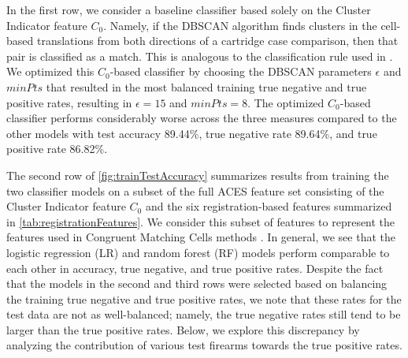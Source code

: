 \documentclass[reprint]{JASA}
\begin{document}
In the first row, we consider a baseline classifier based solely on the
Cluster Indicator feature \(C_0\). Namely, if the DBSCAN algorithm finds
clusters in the cell-based translations from both directions of a
cartridge case comparison, then that pair is classified as a match. This
is analogous to the classification rule used in
\citet{zhang_convergence_2021}. We optimized this \(C_0\)-based
classifier by choosing the DBSCAN parameters \(\epsilon\) and \(minPts\)
that resulted in the most balanced training true negative and true
positive rates, resulting in \(\epsilon = 15\) and \(minPts = 8\). The
optimized \(C_0\)-based classifier performs considerably worse across
the three measures compared to the other models with test accuracy
89.44\%, true negative rate 89.64\%, and true positive rate 86.82\%.

The second row of \autoref{fig:trainTestAccuracy} summarizes results
from training the two classifier models on a subset of the full ACES
feature set consisting of the Cluster Indicator feature \(C_0\) and the
six registration-based features summarized in
\autoref{tab:registrationFeatures}. We consider this subset of features
to represent the features used in Congruent Matching Cells methods
\citep{song_proposed_2013, zhang_convergence_2021}. In general, we see
that the logistic regression (LR) and random forest (RF) models perform
comparable to each other in accuracy, true negative, and true positive
rates. Despite the fact that the models in the second and third rows
were selected based on balancing the training true negative and true
positive rates, we note that these rates for the test data are not as
well-balanced; namely, the true negative rates still tend to be larger
than the true positive rates. Below, we explore this discrepancy by
analyzing the contribution of various test firearms towards the true
positive rates.
\end{document}
